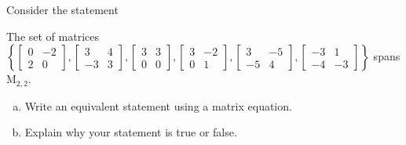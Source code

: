 
\begin{exerciseStatement}


Consider the statement 
\begin{center}\begin{minipage}{0.8\textwidth}
 The set of matrices \( \left\{ \left[\begin{array}{cc}
0 & -2 \\
2 & 0
\end{array}\right] , \left[\begin{array}{cc}
3 & 4 \\
-3 & 3
\end{array}\right] , \left[\begin{array}{cc}
3 & 3 \\
0 & 0
\end{array}\right] , \left[\begin{array}{cc}
3 & -2 \\
0 & 1
\end{array}\right] , \left[\begin{array}{cc}
3 & -5 \\
-5 & 4
\end{array}\right] , \left[\begin{array}{cc}
-3 & 1 \\
-4 & -3
\end{array}\right] \right\} \) spans \(\mathrm{M}_{2,2}\). 
\end{minipage}\end{center}
    


\begin{enumerate}[(a)]
\item  Write an equivalent statement using a matrix equation.
\item  Explain why your statement is true or false.
\end{enumerate}
    
\end{exerciseStatement}
    
